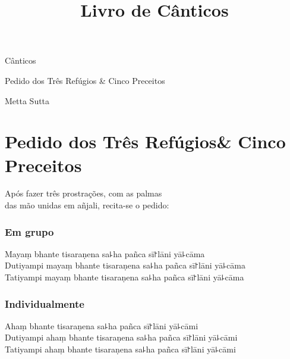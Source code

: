 \documentclass[
  babelLanguage=portuguese,
  final,
]{chantingbook}
\title{Livro de Cânticos}
\subtitle{}
\begin{document}
\frontmatter

\thispagestyle{empty}

{\centering
\mbox{}
\vfill

\begin{minipage}{0.7\linewidth}

\parttitlefont\color{chaptertitle}

Cânticos

\bigskip

{\normalsize
Pedido dos Três Refúgios \& Cinco Preceitos

Metta Sutta
}

\end{minipage}

\vspace*{4\baselineskip}

\vfill

\mbox{}
}

\mainmatter

\artopttrue

\clearpage
\chapter[Três Refúgios \& Cinco Preceitos]{Pedido dos Três Refúgios\newline \& Cinco Preceitos}

\begin{instruction}
  Após fazer três prostrações, com as palmas\\
  das mão unidas em añjali, recita-se o pedido:
\end{instruction}

\subsection{Em grupo}

Mayaṃ bhante tisaraṇena sa꜕ha pañca sī꜓lāni yā꜕cāma\\
Dutiyampi mayaṃ bhante tisaraṇena sa꜕ha pañca sī꜓lāni yā꜕cāma\\
Tatiyampi mayaṃ bhante tisaraṇena sa꜕ha pañca sī꜓lāni yā꜕cāma

\subsection{Individualmente}

Ahaṃ bhante tisaraṇena sa꜕ha pañca sī꜓lāni yā꜕cāmi\\
Dutiyampi ahaṃ bhante tisaraṇena sa꜕ha pañca sī꜓lāni yā꜕cāmi\\
Tatiyampi ahaṃ bhante tisaraṇena sa꜕ha pañca sī꜓lāni yā꜕cāmi
\end{document}
